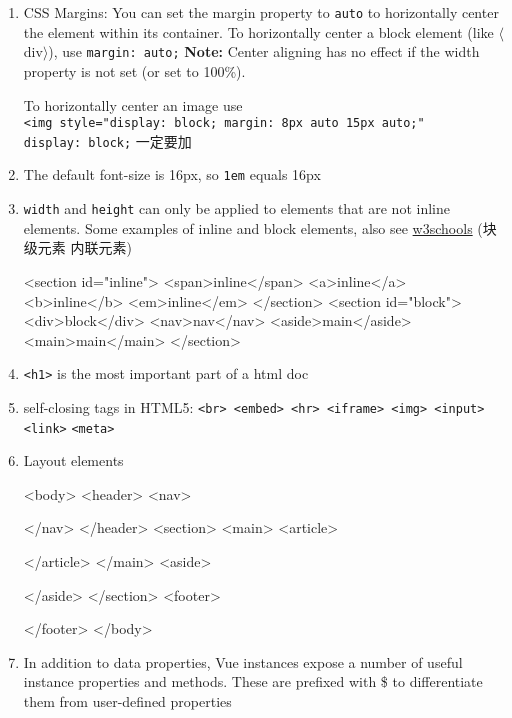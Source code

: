 \documentclass[a4paper,12pt]{article}
\begin{document}
\begin{enumerate}
\item CSS Margins: You can set the margin property to \verb|auto| to horizontally center the element within its container. To horizontally center a block element (like $\langle$div$\rangle$), use \verb|margin: auto;| \textbf{Note:} Center aligning has no effect if the width property is not set (or set to 100\%).

To horizontally center an image use\\ \verb|<img style="display: block; margin: 8px auto 15px auto;"|\\
\verb|display: block;| 一定要加

\item The default font-size is 16px, so \verb|1em| equals 16px

\item \verb|width| and \verb|height| can only be applied to elements that are not inline elements. Some examples of inline and block elements, also see \href{https://www.w3schools.com/html/html_blocks.asp}{w3schools} (块级元素 内联元素)
\begin{htmlcode}
<section id="inline">
  <span>inline</span>
  <a>inline</a>
  <b>inline</b>
  <em>inline</em>
</section>
<section id="block">
  <div>block</div>
  <nav>nav</nav>
  <aside>main</aside>
  <main>main</main>
</section>
\end{htmlcode}

\item \verb|<h1>| is the most important part of a html doc

\item self-closing tags in HTML5: \verb|<br> <embed> <hr> <iframe> <img> <input> <link>| \verb|<meta>|

\item Layout elements
\begin{htmlcode}
<body>
  <header>
    <nav>

    </nav>
  </header>
  <section>
    <main>
      <article>

      </article>
    </main>
    <aside>

    </aside>
  </section>
  <footer>

  </footer>
</body>
\end{htmlcode}

\item In addition to data properties, Vue instances expose a number of useful instance properties and methods. These are prefixed with \$ to differentiate them from user-defined properties


\end{enumerate}
\end{document}
